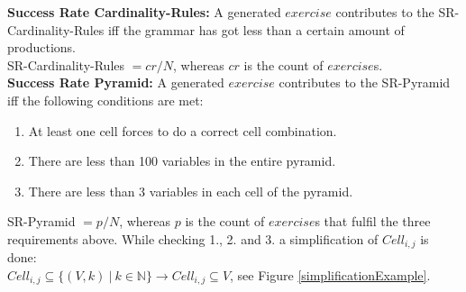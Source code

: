 \noindent\textbf{Success Rate Cardinality-Rules: }
A generated $exercise$ contributes to the SR-Cardinality-Rules iff the grammar has got less than a certain amount of productions.\\
SR-Cardinality-Rules $ = cr / N$, whereas $cr$ is the count of $exercise$s.\\

\noindent\textbf{Success Rate Pyramid: }
A generated $exercise$ contributes to the SR-Pyramid iff the following conditions are met:
\begin{enumerate} [noitemsep]
	\item At least one cell forces to do a correct cell combination.
	\item There are less than 100 variables in the entire pyramid.
	\item There are less than 3 variables in each cell of the pyramid.
\end{enumerate}
SR-Pyramid $= p / N$, whereas $p$ is the count of $exercise$s that fulfil the three requirements above. While checking 1., 2. and 3. a simplification of $Cell_{i,j}$ is done:\\ $Cell_{i,j} \subseteq \{(V,k)~|~k \in \mathbb{N} \} \longrightarrow Cell_{i,j} \subseteq V$, see Figure \ref{simplificationExample}. \\
\noindent 
